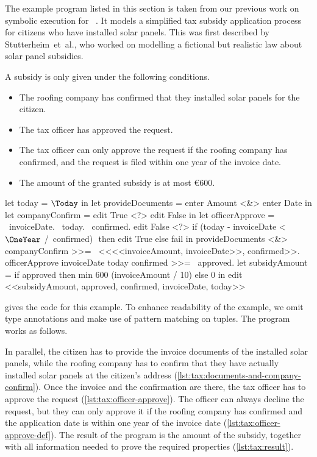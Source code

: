The example program listed in this section is taken from our previous work on symbolic execution for \TOPHAT~\cite{DBLP:conf/ppdp/SteenvoordenNK19}.
It models a simplified tax subsidy application process for citizens who have installed solar panels.
This was first described by Stutterheim~et~al.\cite{conf/sfp/StutterheimAP17},
who worked on modelling a fictional but realistic law about solar panel subsidies.

A subsidy is only given under the following conditions.
\begin{itemize}
\item The roofing company has confirmed that they installed solar panels for the citizen.
\item The tax officer has approved the request.
\item The tax officer can only approve the request if the roofing company has confirmed, and the request is filed within one year of the invoice date.
\item The amount of the granted subsidy is at most €600.
\end{itemize}

\begin{TASK}[
    float=ht,
    numbers=right,
    caption={Subsidy request and approval workflow at the Dutch tax office.},
    captionpos=b,
    label=lst:tax]
  let today = $\Today$ in
  let provideDocuments = enter Amount <&> enter Date in
  let companyConfirm = edit True <?> edit False in
  let officerApprove = \ invoiceDate. \ today. \ confirmed.
    edit False <?> if (today - invoiceDate < $\OneYear$ /\ confirmed) $\label{lst:tax:officer-approve-def}$ then edit True else fail in
  provideDocuments <&> companyConfirm >>= \ <<<<invoiceAmount, invoiceDate>>, confirmed>>. $\label{lst:tax:documents-and-company-confirm}$
  officerApprove invoiceDate today confirmed >>= \ approved.$\label{lst:tax:officer-approve}$
  let subsidyAmount = if approved then min 600 (invoiceAmount / 10) else 0 in
  edit <<subsidyAmount, approved, confirmed, invoiceDate, today>>$\label{lst:tax:result}$
\end{TASK}

 gives the \TOPHAT code for this example.
To enhance readability of the example,
we omit type annotations and make use of pattern matching on tuples.
The program works as follows.

In parallel, the citizen has to provide the invoice documents of the installed solar panels, while the roofing company has to confirm that they have actually installed solar panels at the citizen's address (\cref{lst:tax:documents-and-company-confirm}).
Once the invoice and the confirmation are there, the tax officer has to approve the request (\cref{lst:tax:officer-approve}).
The officer can always decline the request, but they can only approve it if the roofing company has confirmed and the application date is within one year of the invoice date (\cref{lst:tax:officer-approve-def}).
The result of the program is the amount of the subsidy, together with all information needed to prove the required properties (\cref{lst:tax:result}).

